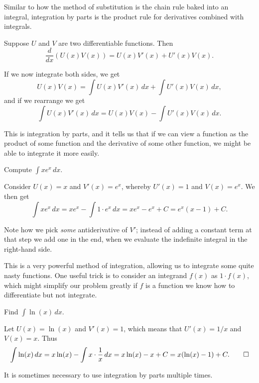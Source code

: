

Similar to how the method of substitution  is the chain rule baked into an integral, integration by parts is the product rule for derivatives combined with integrals.

Suppose $U$ and $V$ are two differentiable functions.
Then
\[
	\frac{d}{d x} (U(x) V(x)) = U(x) V'(x) + U'(x) V(x).
\]

\noindent
If we now integrate both sides, we get
\[
	U(x) V(x) = \int U(x) V'(x) \, d x + \int U'(x) V(x) \, d x,
\]
and if we rearrange we get
\[
	\int U(x) V'(x) \, d x = U(x) V(x) - \int U'(x) V(x) \, d x.
\]

\noindent
This is integration by parts, and it tells us that if we can view a function as the product of some function and the derivative of some other function, we might be able to integrate it more easily.

\begin{example}
	Compute $\int x e^x \, d x$.

	Consider $U(x) = x$ and $V'(x) = e^x$, whereby $U'(x) = 1$ and $V(x) = e^x$.
	We then get
	\[
		\int x e^x \, d x = x e^x - \int 1 \cdot e^x \, d x = x e^x - e^x + C = e^x (x - 1) + C.
	\]

	\noindent
	Note how we pick \emph{some} antiderivative of $V'$; instead of adding a constant term at that step we add one in the end, when we evaluate the indefinite integral in the right-hand side.
\end{example}

\noindent
This is a very powerful method of integration, allowing us to integrate some quite nasty functions.
One useful trick is to consider an integrand $f(x)$ as $1 \cdot f(x)$, which might simplify our problem greatly if $f$ is a function we know how to differentiate but not integrate.

\begin{example}
	Find $\int \ln(x) \, d x$.

	Let $U(x) = \ln(x)$ and $V'(x) = 1$, which means that $U'(x) = 1/x$ and $V(x) = x$.
	Thus
	\[
		\int \ln(x) \, d x = x \ln(x) - \int x \cdot \frac{1}{x} \, d x = x \ln(x) - x + C = x (\ln(x) -1) + C. \qedhere
	\]
\end{example}

\noindent
It is sometimes necessary to use integration by parts multiple times.

